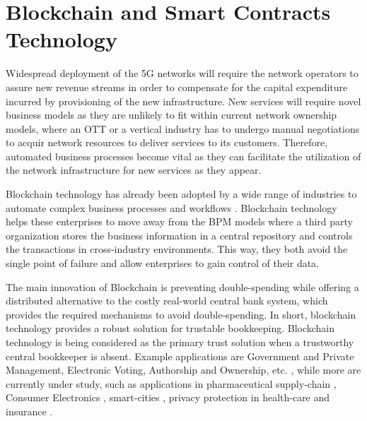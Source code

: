 \section{Blockchain and Smart Contracts Technology}
\label{Back:Sec:blockchain}



Widespread deployment of the \ac{5G} networks will require the network operators to assure new revenue streams in order to compensate for the capital expenditure incurred by provisioning of the new infrastructure. New services will require novel business models as they are unlikely to fit within current network ownership models, where an \ac{OTT} or a vertical industry has to undergo manual negotiations to acquir network resources to deliver services to its customers. Therefore, automated business processes become vital as they can facilitate the utilization of the network infrastructure for new services as they appear.


Blockchain technology has already been adopted by a wide range of industries to automate complex business processes and workflows \cite{fridgen2018cross,milani2016blockchain}. Blockchain technology helps these enterprises to move away from the \ac{BPM} models where a third party organization stores the business information in a central repository and controls the transactions in cross-industry environments. This way, they both avoid the single point of failure and allow enterprises to gain control of their data.

The main innovation of  Blockchain is preventing double-spending while offering a distributed alternative to the costly real-world central bank system, which provides the required mechanisms to avoid double-spending. In short, blockchain technology provides a robust solution for trustable bookkeeping. Blockchain technology is being considered as the primary trust solution when a trustworthy central bookkeeper is absent. Example applications are Government and Private Management, Electronic Voting, Authorship and Ownership, etc. \cite{8552978}, while more are currently under study, such as applications in pharmaceutical supply-chain \cite{7987376}, Consumer Electronics \cite{8386955}, smart-cities \cite{8386958}, privacy protection in health-care \cite{8386918} and insurance \cite{8386868}. 


